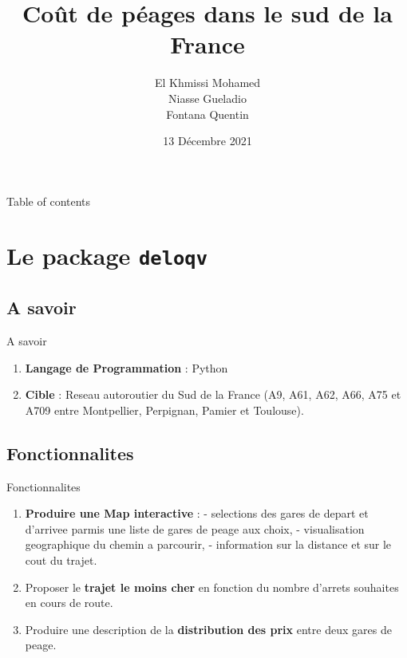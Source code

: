 \documentclass{beamer}
\title{Coût de péages dans le sud de la France}
\author{El Khmissi Mohamed \\ Niasse Gueladio \\ Fontana Quentin }
\date{13 Décembre 2021}
\begin{document}
\begin{frame}
    \titlepage 
\end{frame}
\begin{frame}{Table of contents}
    \tableofcontents
\end{frame}


\section{Le package \texttt{deloqv}}
\subsection{A savoir}
\begin{frame}{A savoir}
\begin{enumerate}
    \item \textbf{Langage de Programmation} : Python
    \item \textbf{Cible} : Reseau autoroutier du Sud de la France (A9, A61, A62, A66, A75 et A709 entre Montpellier, Perpignan, Pamier et Toulouse).
\end{enumerate}
\end{frame}

\subsection{Fonctionnalites}
\begin{frame}{Fonctionnalites}
\begin{enumerate}
    \item \textbf{Produire une Map interactive} : \newline
     \quad - selections des gares de depart et d'arrivee parmis une liste de gares de peage aux choix, \newline
     \quad - visualisation geographique du chemin a parcourir, \newline
     \quad - information sur la distance et sur le cout du trajet. 
    \item Proposer le \textbf{trajet le moins cher} en fonction du nombre d'arrets souhaites en cours de route.
    \item Produire une description de la \textbf{distribution des prix} entre deux gares de peage.
\end{enumerate}
\end{frame}
\end{document}
